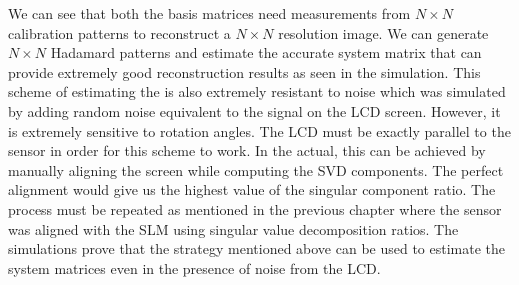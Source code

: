 We can see that both the basis matrices need measurements from $N\times N$ calibration patterns to reconstruct a $N \times N$ resolution image. We can generate $N \times N$ Hadamard patterns and estimate the accurate system matrix that can provide extremely good reconstruction results as seen in the simulation. This scheme of estimating the is also extremely resistant to noise which was simulated by adding random noise equivalent to the signal on the LCD screen. However, it is extremely sensitive to rotation angles. The LCD must be exactly parallel to the sensor in order for this scheme to work. In the actual, this can be achieved by manually aligning the screen while computing the SVD components. The perfect alignment would give us the highest value of the singular component ratio. The process must be repeated as mentioned in the previous chapter where the sensor was aligned with the SLM using singular value decomposition ratios. The simulations prove that the strategy mentioned above can be used to estimate the system matrices even in the presence of noise from the LCD.